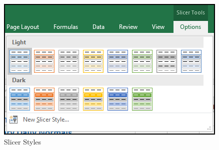 \begin{figure}[H]
	\centering
	\includegraphics[width=\maxwidth{.95\linewidth}]{gfx/ch05_fig20}
	\caption{Slicer Styles}
	\label{05:fig20}
\end{figure}

